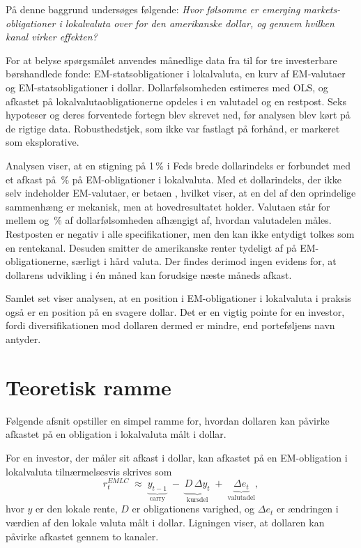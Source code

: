 \documentclass[11pt,a4paper]{article}
\begin{document}
På denne baggrund undersøges følgende: \emph{Hvor følsomme er emerging markets-obligationer i lokalvaluta over for den amerikanske dollar, og gennem hvilken kanal virker effekten?}

For at belyse spørgsmålet anvendes månedlige data fra \SampleStart{} til \SampleEnd{} for tre investerbare børshandlede fonde: EM-statsobligationer i lokalvaluta, en kurv af EM-valutaer og EM-statsobligationer i dollar. Dollarfølsomheden estimeres med OLS, og afkastet på lokalvalutaobligationerne opdeles i en valutadel og en restpost. Seks hypoteser og deres forventede fortegn blev skrevet ned, før analysen blev kørt på de rigtige data. Robusthedstjek, som ikke var fastlagt på forhånd, er markeret som eksplorative.

Analysen viser, at en stigning på 1\,\% i Feds brede dollarindeks er forbundet med et afkast på \BetaEMLC\,\% på EM-obligationer i lokalvaluta. Med et dollarindeks, der ikke selv indeholder EM-valutaer, er betaen \AfeEMLC, hvilket viser, at en del af den oprindelige sammenhæng er mekanisk, men at hovedresultatet holder. Valutaen står for mellem \AndelMin{} og \AndelMax\,\% af dollarfølsomheden afhængigt af, hvordan valutadelen måles. Restposten er negativ i alle specifikationer, men den kan ikke entydigt tolkes som en rentekanal. Desuden smitter de amerikanske renter tydeligt af på EM-obligationerne, særligt i hård valuta. Der findes derimod ingen evidens for, at dollarens udvikling i én måned kan forudsige næste måneds afkast.

Samlet set viser analysen, at en position i EM-obligationer i lokalvaluta i praksis også er en position på en svagere dollar. Det er en vigtig pointe for en investor, fordi diversifikationen mod dollaren dermed er mindre, end porteføljens navn antyder.

\section{Teoretisk ramme}

Følgende afsnit opstiller en simpel ramme for, hvordan dollaren kan påvirke afkastet på en obligation i lokalvaluta målt i dollar.

For en investor, der måler sit afkast i dollar, kan afkastet på en EM-obligation i lokalvaluta tilnærmelsesvis skrives som
\begin{equation}\label{eq:teori}
r^{EMLC}_t \;\approx\; \underbrace{y_{t-1}}_{\text{carry}} \;-\; \underbrace{D \, \Delta y_t}_{\text{kursdel}} \;+\; \underbrace{\Delta e_t}_{\text{valutadel}},
\end{equation}
hvor $y$ er den lokale rente, $D$ er obligationens varighed, og $\Delta e_t$ er ændringen i værdien af den lokale valuta målt i dollar. Ligningen viser, at dollaren kan påvirke afkastet gennem to kanaler.
\end{document}
